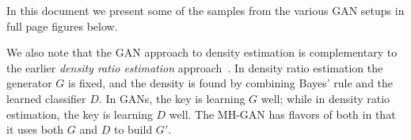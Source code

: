 \documentclass{article}
\begin{document}

In this document we present some of the samples from the various GAN setups in full page figures below.

We also note that the GAN approach to density estimation is complementary to the earlier \emph{density ratio estimation} approach~\citep{Sugiyama2012}\@.
In density ratio estimation the generator $G$ is fixed, and the density is found by combining Bayes' rule and the learned classifier $D$.
In GANs, the key is learning $G$ well; while in density ratio estimation, the key is learning $D$ well.
The MH-GAN has flavors of both in that it uses both $G$ and $D$ to build $G'$.
\end{document}
